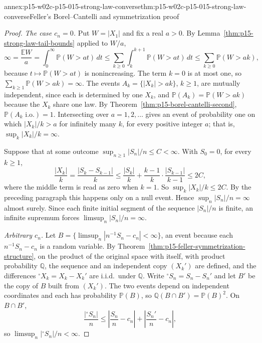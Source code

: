 \begin{annexitem}{annex:p15-w02c-p15-015-strong-law-converse}{thm:p15-w02c-p15-015-strong-law-converse}{Feller's Borel--Cantelli and symmetrization proof}
\begin{proof}
\emph{The case \(c_n=0\).} Put \(W=|X_1|\) and fix a real \(a>0\).
By Lemma~\ref{thm:p15-strong-law-tail-bounds} applied to \(W/a\),
\[
 \infty=\frac{\mathbb EW}{a}=\int_0^\infty\mathbb P(W>at)\,dt
 \leq\sum_{k\geq0}\int_k^{k+1}\mathbb P(W>at)\,dt
 \leq\sum_{k\geq0}\mathbb P(W>ak),
\]
because \(t\mapsto\mathbb P(W>at)\) is nonincreasing. The term \(k=0\)
is at most one, so \(\sum_{k\geq1}\mathbb P(W>ak)=\infty\). The events
\(A_k=\{|X_k|>ak\}\), \(k\geq1\), are mutually independent, since each
is determined by one \(X_k\), and
\(\mathbb P(A_k)=\mathbb P(W>ak)\) because the \(X_k\) share one law.
By Theorem~\ref{thm:p15-borel-cantelli-second},
\(\mathbb P(A_k\text{ i.o.})=1\). Intersecting over \(a=1,2,\ldots\)
gives an event of probability one on which
\(|X_k|/k>a\) for infinitely many \(k\), for every positive integer
\(a\); that is, \(\sup_k|X_k|/k=\infty\).

Suppose that at some outcome \(\sup_{n\geq1}|S_n|/n\leq C<\infty\).
With \(S_0=0\), for every \(k\geq1\),
\[
 \frac{|X_k|}{k}=\frac{|S_k-S_{k-1}|}{k}
 \leq\frac{|S_k|}{k}+\frac{k-1}{k}\cdot\frac{|S_{k-1}|}{k-1}
 \leq2C,
\]
where the middle term is read as zero when \(k=1\). So
\(\sup_k|X_k|/k\leq2C\). By the preceding paragraph this happens
only on a null event. Hence \(\sup_n|S_n|/n=\infty\) almost surely.
Since each finite initial segment of the sequence \(|S_n|/n\) is
finite, an infinite supremum forces \(\limsup_n|S_n|/n=\infty\).

\emph{Arbitrary \(c_n\).} Let
\(B=\{\limsup_n|n^{-1}S_n-c_n|<\infty\}\), an event because each
\(n^{-1}S_n-c_n\) is a random variable. By
Theorem~\ref{thm:p15-feller-symmetrization-structure}, on the product of
the original space with itself, with product probability
\(\mathbb Q\), the sequence and an independent copy
\((X_k')\) are defined, and the differences
\({}^{\circ}X_k=X_k-X_k'\) are i.i.d.\ under \(\mathbb Q\). Write
\({}^{\circ}S_n=S_n-S_n'\) and let \(B'\) be the copy of \(B\) built
from \((X_k')\). The two events depend on independent coordinates and
each has probability \(\mathbb P(B)\), so
\(\mathbb Q(B\cap B')=\mathbb P(B)^2\). On \(B\cap B'\),
\[
 \frac{|{}^{\circ}S_n|}{n}
 \leq\left|\frac{S_n}{n}-c_n\right|+\left|\frac{S_n'}{n}-c_n\right|,
\]
so \(\limsup_n|{}^{\circ}S_n|/n<\infty\).


\end{proof}
\end{annexitem}
